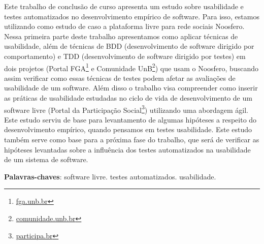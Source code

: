 \begin{resumo}

Este trabalho de conclusão de curso apresenta um estudo sobre usabilidade e testes automatizados no desenvolvimento empírico de software. Para isso, estamos utilizando como estudo de caso a plataforma livre para rede sociais Noosfero. Nessa primeira parte deste trabalho apresentamos como aplicar técnicas de usabilidade, além de técnicas de BDD (desenvolvimento de software dirigido por comportamento) e TDD (desenvolvimento de software dirigido por testes) em dois projetos (Portal FGA\footnote{\url{fga.unb.br}} e Comunidade UnB\footnote{\url{comunidade.unb.br}}) que usam o Noosfero, buscando assim verificar como essas técnicas de testes podem afetar as avaliações de usabilidade de um software.  Além disso o trabalho visa compreender como inserir as práticas de usabilidade estudadas no ciclo de vida de desenvolvimento de um software livre (Portal da Participação Social\footnote{\url{participa.br}}) utilizando uma abordagem ágil. 
Este estudo serviu de base para levantamento de algumas hipóteses a respeito do desenvolvimento empírico, quando pensamos em testes usabilidade. Este estudo também serve como base para a próxima fase do trabalho, que será de verificar as hipóteses levantadas sobre a influência dos testes automatizados na usabilidade de um sistema de software.



\vspace{\onelineskip}
    
 \noindent
 \textbf{Palavras-chaves}: software livre. testes automatizados. usabilidade.

\end{resumo}
